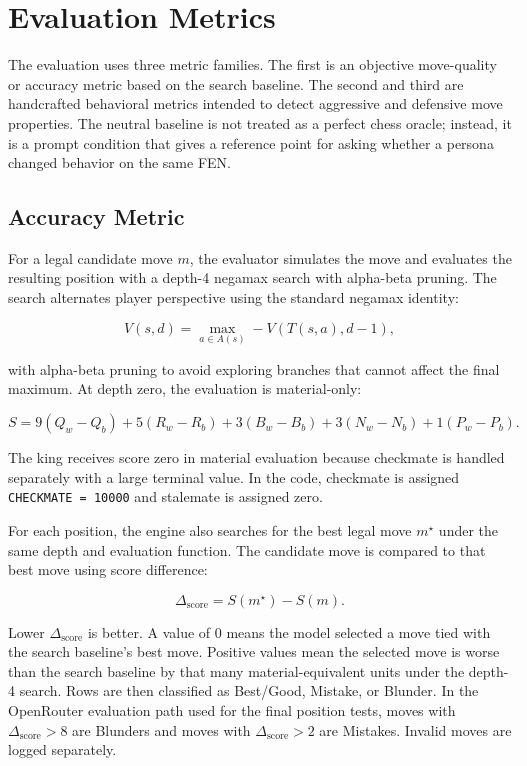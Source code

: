 \documentclass[10pt]{article}
\begin{document}
\section{Evaluation Metrics}

The evaluation uses three metric families. The first is an objective move-quality or accuracy metric based on the search baseline. The second and third are handcrafted behavioral metrics intended to detect aggressive and defensive move properties. The neutral baseline is not treated as a perfect chess oracle; instead, it is a prompt condition that gives a reference point for asking whether a persona changed behavior on the same FEN.

\subsection{Accuracy Metric}

For a legal candidate move $m$, the evaluator simulates the move and evaluates the resulting position with a depth-4 negamax search with alpha-beta pruning. The search alternates player perspective using the standard negamax identity:

\[
V(s, d) = \max_{a \in A(s)} -V(T(s,a), d-1),
\]

with alpha-beta pruning to avoid exploring branches that cannot affect the final maximum. At depth zero, the evaluation is material-only:

\[
S = 9(Q_w-Q_b) + 5(R_w-R_b) + 3(B_w-B_b) + 3(N_w-N_b) + 1(P_w-P_b).
\]

The king receives score zero in material evaluation because checkmate is handled separately with a large terminal value. In the code, checkmate is assigned \texttt{CHECKMATE = 10000} and stalemate is assigned zero.

For each position, the engine also searches for the best legal move $m^\star$ under the same depth and evaluation function. The candidate move is compared to that best move using score difference:

\[
\Delta_{\text{score}} = S(m^\star) - S(m).
\]

Lower $\Delta_{\text{score}}$ is better. A value of 0 means the model selected a move tied with the search baseline's best move. Positive values mean the selected move is worse than the search baseline by that many material-equivalent units under the depth-4 search. Rows are then classified as Best/Good, Mistake, or Blunder. In the OpenRouter evaluation path used for the final position tests, moves with $\Delta_{\text{score}} > 8$ are Blunders and moves with $\Delta_{\text{score}} > 2$ are Mistakes. Invalid moves are logged separately.
\end{document}

